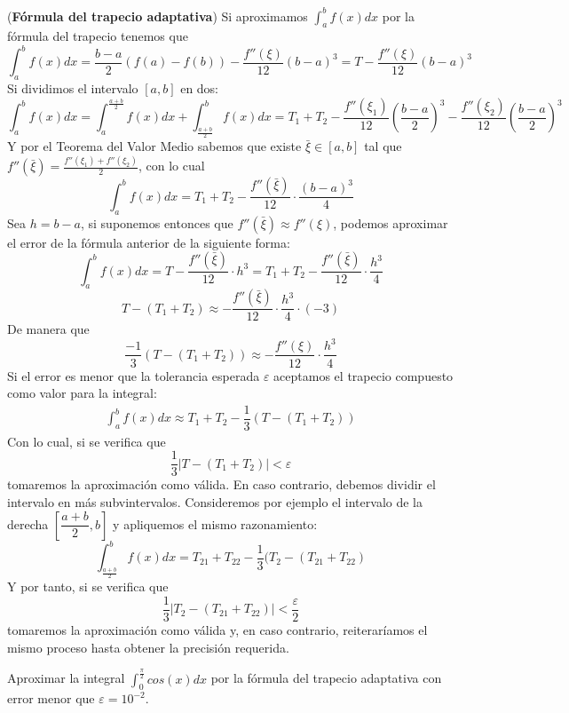  \begin{ejem}
    (\textbf{Fórmula del trapecio adaptativa}) Si aproximamos $\int_a^bf(x)dx$ por la fórmula del trapecio tenemos que
    $$\int_a^bf(x)dx=\dfrac{b-a}{2}(f(a)-f(b))-\dfrac{f''(\xi)}{12}(b-a)^3=T-\dfrac{f''(\xi)}{12}(b-a)^3$$
    Si dividimos el intervalo $[a,b]$ en dos:
    $$\int_a^bf(x)dx=\int_a^{\frac{a+b}{2}}f(x)dx+\int_{\frac{a+b}{2}}^bf(x)dx=T_1+T_2-\dfrac{f''(\xi_1)}{12}\left(\dfrac{b-a}{2}\right)^3-\dfrac{f''(\xi_2)}{12}\left(\dfrac{b-a}{2}\right)^3$$
    Y por el Teorema del Valor Medio sabemos que existe $\bar{\xi}\in[a,b]$ tal que $f''(\bar{\xi})=\frac{f''(\xi_1)+f''(\xi_2)}{2}$, con lo cual
    $$\int_a^bf(x)dx=T_1+T_2-\dfrac{f''(\bar{\xi})}{12}\cdot \dfrac{(b-a)^3}{4}$$
    Sea $h=b-a$, si suponemos entonces que $f''(\bar{\xi})\approx f''(\xi)$, podemos aproximar el error de la fórmula anterior de la siguiente forma:
    $$\int_a^bf(x)dx=T-\dfrac{f''(\bar{\xi})}{12}\cdot h^3= T_1+T_2-\dfrac{f''(\bar{\xi})}{12}\cdot \dfrac{h^3}{4}$$
    $$T-(T_1+T_2)\approx-\dfrac{f''(\bar{\xi})}{12}\cdot \dfrac{h^3}{4}\cdot (-3)$$
    De manera que
    $$\dfrac{-1}{3}(T-(T_1+T_2))\approx -\dfrac{f''(\xi)}{12}\cdot \dfrac{h^3}{4}$$
    Si el error es menor que la tolerancia esperada $\varepsilon$ aceptamos el trapecio compuesto como valor para la integral:
    \begin{align}
     \int_a^bf(x)dx\approx T_1+T_2-\dfrac{1}{3}(T-(T_1+T_2))
     \label{trap:adap}
    \end{align}
    Con lo cual, si se verifica que
    $$\dfrac{1}{3}|T-(T_1+T_2)|<\varepsilon$$
    tomaremos la aproximación como válida. En caso contrario, debemos dividir el intervalo en más subvintervalos. Consideremos por ejemplo el intervalo de la derecha $\left[\dfrac{a+b}{2},b\right]$ y apliquemos el mismo razonamiento:
    $$\int_{\frac{a+b}{2}}^bf(x)dx=T_{21}+T_{22}-\dfrac{1}{3}(T_2-(T_{21}+T_{22})$$
    Y por tanto, si se verifica que
    $$\dfrac{1}{3}|T_2-(T_{21}+T_{22})|<\dfrac{\varepsilon}{2}$$
    tomaremos la aproximación como válida y, en caso contrario, reiteraríamos el mismo proceso hasta obtener la precisión requerida. 
 \end{ejem}
 \begin{ejer}
    Aproximar la integral $\int_0^{\frac{\pi}{2}}cos(x)dx$ por la fórmula del trapecio adaptativa con error menor que $\varepsilon=10^{-2}$.
 \end{ejer}
